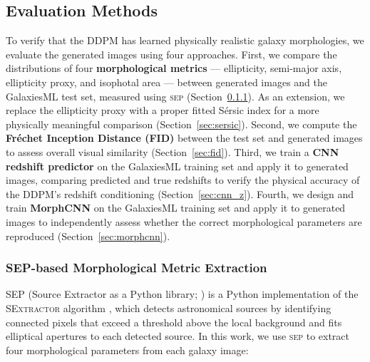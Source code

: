 \documentclass[fleqn,usenatbib]{mnras}
\begin{document}
\subsection{Evaluation Methods}
\label{sec:eval_methods}

To verify that the DDPM has learned physically realistic galaxy
morphologies, we evaluate the generated images using four approaches.
First, we compare the distributions of four \textbf{morphological metrics}
--- ellipticity, semi-major axis, ellipticity proxy, and isophotal
area --- between generated images and the GalaxiesML test set,
measured using \textsc{sep} (Section~\ref{sec:sep}).
As an extension, we replace the ellipticity proxy with a proper fitted
S\'{e}rsic index for a more physically meaningful comparison
(Section~\ref{sec:sersic}).
Second, we compute the \textbf{Fr\'{e}chet Inception Distance (FID)} between
the test set and generated images to assess overall visual similarity
(Section~\ref{sec:fid}).
Third, we train a \textbf{CNN redshift predictor} on the GalaxiesML
training set and apply it to generated images, comparing predicted and
true redshifts to verify the physical accuracy of the DDPM's redshift
conditioning (Section~\ref{sec:cnn_z}).
Fourth, we design and train \textbf{MorphCNN} on the GalaxiesML
training set and apply it to
generated images to independently assess whether the correct
morphological parameters are reproduced (Section~\ref{sec:morphcnn}).

\subsubsection{SEP-based Morphological Metric Extraction}
\label{sec:sep}

SEP (Source Extractor as a Python library; \citealt{barbary2016})
is a Python implementation of the \textsc{SExtractor} algorithm
\citep{bertin1996}, which detects astronomical sources by identifying
connected pixels that exceed a threshold above the local background
and fits elliptical apertures to each detected source.
In this work, we use \textsc{sep} to extract four morphological
parameters from each galaxy image:
\end{document}
